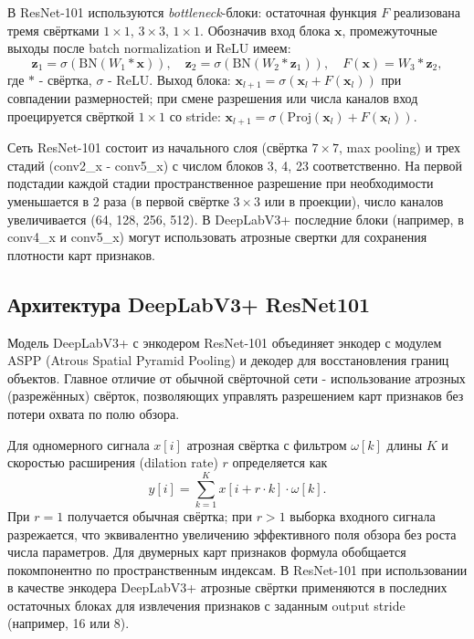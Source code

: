 \documentclass[areasetadvanced]{scrartcl}
\begin{document}
В ResNet-101 используются \emph{bottleneck}-блоки: остаточная функция $F$ реализована тремя свёртками $1\times 1$, $3\times 3$, $1\times 1$. Обозначив вход блока $\mathbf{x}$, промежуточные выходы после batch normalization и ReLU имеем:
\begin{equation}
\mathbf{z}_1 = \sigma(\mathrm{BN}(W_1 * \mathbf{x})),\quad
\mathbf{z}_2 = \sigma(\mathrm{BN}(W_2 * \mathbf{z}_1)),\quad
F(\mathbf{x}) = W_3 * \mathbf{z}_2,
\end{equation}
где $*$ - свёртка, $\sigma$ - ReLU. Выход блока: $\mathbf{x}_{l+1} = \sigma(\mathbf{x}_l + F(\mathbf{x}_l))$ при совпадении размерностей; при смене разрешения или числа каналов вход проецируется свёрткой $1\times 1$ со stride: $\mathbf{x}_{l+1} = \sigma(\mathrm{Proj}(\mathbf{x}_l) + F(\mathbf{x}_l))$.

Сеть ResNet-101 состоит из начального слоя (свёртка $7\times 7$, max pooling) и трех стадий (conv2\_x  - conv5\_x) с числом блоков 3, 4, 23 соответственно. На первой подстадии каждой стадии пространственное разрешение при необходимости уменьшается в 2 раза (в первой свёртке $3\times 3$ или в проекции), число каналов увеличивается (64, 128, 256, 512). В DeepLabV3+ последние блоки (например, в conv4\_x и conv5\_x) могут использовать атрозные свертки для сохранения плотности карт признаков.

\subsection{Архитектура DeepLabV3+ ResNet101}
Модель DeepLabV3+ с энкодером ResNet-101 объединяет энкодер с модулем ASPP (Atrous Spatial Pyramid Pooling) и декодер для восстановления границ объектов. Главное отличие от обычной свёрточной сети - использование атрозных (разрежённых) свёрток, позволяющих управлять разрешением карт признаков без потери охвата по полю обзора.

Для одномерного сигнала $x[i]$ атрозная свёртка с фильтром $\omega[k]$ длины $K$ и скоростью расширения (dilation rate) $r$ определяется как
\begin{equation}
y[i] = \sum_{k=1}^{K} x[i + r \cdot k] \cdot \omega[k].
\end{equation}
При $r=1$ получается обычная свёртка; при $r>1$ выборка входного сигнала разрежается, что эквивалентно увеличению эффективного поля обзора без роста числа параметров. Для двумерных карт признаков формула обобщается покомпонентно по пространственным индексам. В ResNet-101 при использовании в качестве энкодера DeepLabV3+ атрозные свёртки применяются в последних остаточных блоках для извлечения признаков с заданным output stride (например, 16 или 8).
\end{document}
